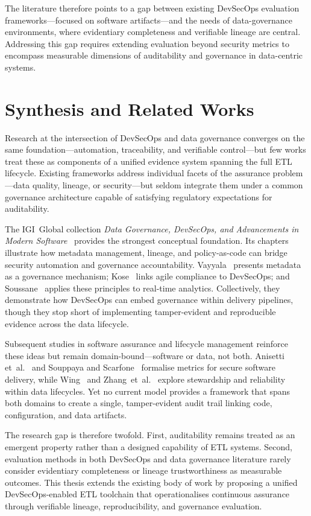 The literature therefore points to a gap between existing DevSecOps evaluation
frameworks—focused on software artifacts—and the needs of data-governance
environments, where evidentiary completeness and verifiable lineage are central.
Addressing this gap requires extending evaluation beyond security metrics to
encompass measurable dimensions of auditability and governance in data-centric
systems.


\section{Synthesis and Related Works}

Research at the intersection of DevSecOps and data governance converges on the
same foundation—automation, traceability, and verifiable control—but few works
treat these as components of a unified evidence system spanning the full ETL
lifecycle.  Existing frameworks address individual facets of the assurance
problem—data quality, lineage, or security—but seldom integrate them under a
common governance architecture capable of satisfying regulatory expectations for
auditability.

The IGI~Global collection \emph{Data Governance, DevSecOps, and Advancements in
Modern Software}~\cite{elbaghazaoui_data_2025} provides the strongest conceptual
foundation.  Its chapters illustrate how metadata management, lineage, and
policy-as-code can bridge security automation and governance accountability.
Vayyala~\cite{elbaghazaoui_metadata_2025} presents metadata as a governance
mechanism; Kose~\cite{elbaghazaoui_agility_2025} links agile compliance to
DevSecOps; and Soussane~\cite{elbaghazaoui_integrating_2025} applies these
principles to real-time analytics.  Collectively, they demonstrate how DevSecOps
can embed governance within delivery pipelines, though they stop short of
implementing tamper-evident and reproducible evidence across the data lifecycle.

Subsequent studies in software assurance and lifecycle management reinforce
these ideas but remain domain-bound—software or data, not both.  Anisetti
et~al.~\cite{anisetti_devsecops-based_2022} and Souppaya and
Scarfone~\cite{souppaya_secure_2022} formalise metrics for secure software
delivery, while Wing~\cite{wing_data_2019} and Zhang~et~al.~\cite{zhang_best_2022}
explore stewardship and reliability within data lifecycles.  Yet no current
model provides a framework that spans both domains to create a single,
tamper-evident audit trail linking code, configuration, and data artifacts.

The research gap is therefore twofold.  First, auditability remains treated as
an emergent property rather than a designed capability of ETL systems.  Second,
evaluation methods in both DevSecOps and data governance literature rarely
consider evidentiary completeness or lineage trustworthiness as measurable
outcomes.  This thesis extends the existing body of work by proposing a unified
DevSecOps-enabled ETL toolchain that operationalises continuous assurance
through verifiable lineage, reproducibility, and governance evaluation.

